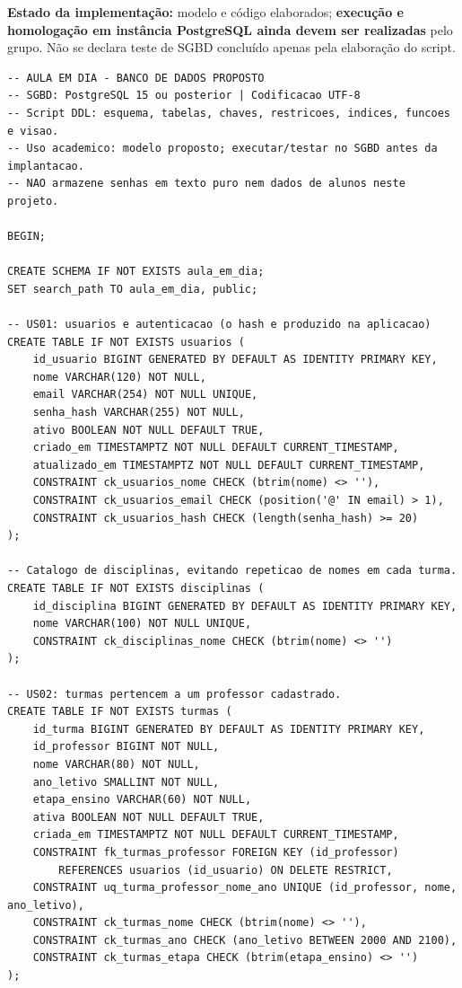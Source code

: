 \documentclass[12pt,a4paper,oneside]{report}
\begin{document}
\noindent\textbf{Estado da implementação:} modelo e código elaborados; \textbf{execução e homologação em instância PostgreSQL ainda devem ser realizadas} pelo grupo. Não se declara teste de SGBD concluído apenas pela elaboração do script.

\begin{lstlisting}[style=aulasql,caption={Código SQL completo do banco de dados Aula em Dia},label={lst:bd-ddl}]
-- AULA EM DIA - BANCO DE DADOS PROPOSTO
-- SGBD: PostgreSQL 15 ou posterior | Codificacao UTF-8
-- Script DDL: esquema, tabelas, chaves, restricoes, indices, funcoes e visao.
-- Uso academico: modelo proposto; executar/testar no SGBD antes da implantacao.
-- NAO armazene senhas em texto puro nem dados de alunos neste projeto.

BEGIN;

CREATE SCHEMA IF NOT EXISTS aula_em_dia;
SET search_path TO aula_em_dia, public;

-- US01: usuarios e autenticacao (o hash e produzido na aplicacao)
CREATE TABLE IF NOT EXISTS usuarios (
    id_usuario BIGINT GENERATED BY DEFAULT AS IDENTITY PRIMARY KEY,
    nome VARCHAR(120) NOT NULL,
    email VARCHAR(254) NOT NULL UNIQUE,
    senha_hash VARCHAR(255) NOT NULL,
    ativo BOOLEAN NOT NULL DEFAULT TRUE,
    criado_em TIMESTAMPTZ NOT NULL DEFAULT CURRENT_TIMESTAMP,
    atualizado_em TIMESTAMPTZ NOT NULL DEFAULT CURRENT_TIMESTAMP,
    CONSTRAINT ck_usuarios_nome CHECK (btrim(nome) <> ''),
    CONSTRAINT ck_usuarios_email CHECK (position('@' IN email) > 1),
    CONSTRAINT ck_usuarios_hash CHECK (length(senha_hash) >= 20)
);

-- Catalogo de disciplinas, evitando repeticao de nomes em cada turma.
CREATE TABLE IF NOT EXISTS disciplinas (
    id_disciplina BIGINT GENERATED BY DEFAULT AS IDENTITY PRIMARY KEY,
    nome VARCHAR(100) NOT NULL UNIQUE,
    CONSTRAINT ck_disciplinas_nome CHECK (btrim(nome) <> '')
);

-- US02: turmas pertencem a um professor cadastrado.
CREATE TABLE IF NOT EXISTS turmas (
    id_turma BIGINT GENERATED BY DEFAULT AS IDENTITY PRIMARY KEY,
    id_professor BIGINT NOT NULL,
    nome VARCHAR(80) NOT NULL,
    ano_letivo SMALLINT NOT NULL,
    etapa_ensino VARCHAR(60) NOT NULL,
    ativa BOOLEAN NOT NULL DEFAULT TRUE,
    criada_em TIMESTAMPTZ NOT NULL DEFAULT CURRENT_TIMESTAMP,
    CONSTRAINT fk_turmas_professor FOREIGN KEY (id_professor)
        REFERENCES usuarios (id_usuario) ON DELETE RESTRICT,
    CONSTRAINT uq_turma_professor_nome_ano UNIQUE (id_professor, nome, ano_letivo),
    CONSTRAINT ck_turmas_nome CHECK (btrim(nome) <> ''),
    CONSTRAINT ck_turmas_ano CHECK (ano_letivo BETWEEN 2000 AND 2100),
    CONSTRAINT ck_turmas_etapa CHECK (btrim(etapa_ensino) <> '')
);


\end{lstlisting}
\end{document}

